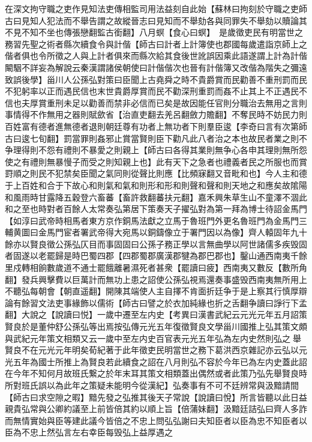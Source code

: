 在深文拘守職之吏作見知法吏傳相監司用法益刻自此始【蘇林曰拘刻於守職之吏師古曰見知人犯法而不舉告謂之故縱晉志曰見知而不舉劾各與同罪失不舉劾以贖論其不見不知不坐也傳張戀翻監古銜翻】八月螟【食心曰螟】　是歲徵吏民有明當世之務習先聖之術者縣次續食令與計偕【師古曰計者上計簿使也郡國每歲遣詣京師上之偕者俱也令所徵之人與上計者俱來而縣次給其食後世訛誤因乘此語遂謂上計為計偕闞駰不詳妄為解說云秦漢謂諸侯朝使曰計偕偕次也晉有計偕簿又改偕為階失之彌遠致誤後學】甾川人公孫弘對策曰臣聞上古堯舜之時不貴爵賞而民勸善不重刑罰而民不犯躬率以正而遇民信也末世貴爵厚賞而民不勸深刑重罰而姦不止其上不正遇民不信也夫厚賞重刑未足以勸善而禁非必信而已矣是故因能任官則分職治去無用之言則事情得不作無用之器則賦歛省【治直吏翻去羌呂翻斂力贍翻】不奪民時不妨民力則百姓富有德者進無德者退則朝廷尊有功者上無功者下則羣臣逡【李奇曰言有次第師古曰逡七旬翻】罰當罪則姦邪止賞當賢則臣下勸凡此八者治之本也故民者業之則不争理得則不怨有禮則不暴愛之則親上【師古曰各得其業則無争心各申其理則無所怨使之有禮則無暴慢子而受之則知親上也】此有天下之急者也禮義者民之所服也而賞罸順之則民不犯禁矣臣聞之氣同則從聲比則應【比頻寐翻又音毗和也】今人主和德于上百姓和合于下故心和則氣和氣和則形和形和則聲和聲和則天地之和應矣故隂陽和風雨時甘露降五穀登六畜蕃【畜許救翻蕃扶元翻】嘉禾興朱草生山不童澤不涸此和之至也時對者百餘人太常奏弘第居下策奏天子擢弘對為第一拜為博士待詔金馬門【如淳曰武帝時相馬者東方京作銅馬法獻之立馬于魯班門外更名魯班門為金馬門三輔黄圖曰金馬門宦者署武帝得大宛馬以銅鑄像立于署門因以為像】齊人轅固年九十餘亦以賢良徵公孫弘仄目而事固固曰公孫子務正學以言無曲學以阿世諸儒多疾毁固者固遂以老罷歸是時巴蜀四郡【四郡蜀郡廣漢郡犍為郡巴郡也】鑿山通西南夷千餘里戍轉相餉數歲道不通士罷餓離暑濕死者甚衆【罷讀曰疲】西南夷又數反【數所角翻】發兵興擊費以巨萬計而無功上患之詔使公孫弘視焉還奏事盛毁西南夷無所用上不聽弘每朝會【朝直遥翻】開陳其端使人主自擇不肯面折廷争于是上察其行慎厚辯論有餘習文法吏事緣飾以儒術【師古曰譬之於衣加純緣也折之舌翻争讀曰諍行下孟翻】大說之【說讀曰悦】一歲中遷至左内史【考異曰漢書武紀云元光元年五月詔策賢良於是董仲舒公孫弘等出焉按弘傳元光五年復徵賢良文學甾川國推上弘其策文頗與武紀元年策文相類又云一歲中至左内史百官表元光五年弘為左内史然則弘之舉賢良不在元光元年明矣荀紀著于此年徵吏民明當世之務下葛洪西京雜記亦云弘以元光五年為國士所推上為賢良若此續食之詔在八月則弘不容於今年已為左内史蓋此詔在今年不知何月故班氏繋之於年末耳其策文相類蓋出偶然或者此策乃弘先舉賢良時所對班氏誤以為此年之策疑未能明今從漢紀】弘奏事有不可不廷辨常與汲黯請間【師古曰求空隙之暇】黯先發之弘推其後天子常說【說讀曰悅】所言皆聽以此日益親貴弘常與公卿約議至上前皆倍其約以順上旨【倍蒲妹翻】汲黯廷詰弘曰齊人多詐而無情實始與臣等建此議今皆倍之不忠上問弘弘謝曰夫知臣者以臣為忠不知臣者以臣為不忠上然弘言左右幸臣每毁弘上益厚遇之

